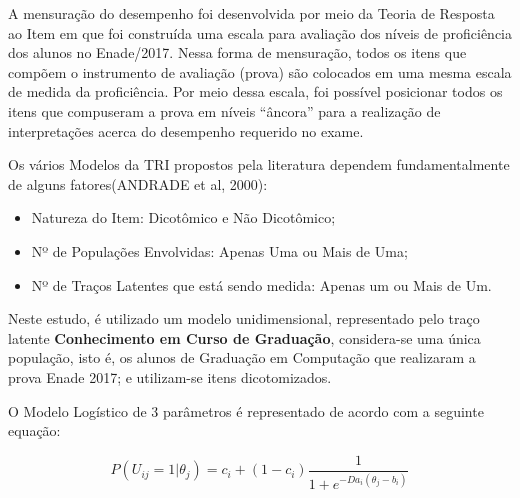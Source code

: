 \documentclass[12pt]{article}
\begin{document}
A mensuração do desempenho foi desenvolvida por meio da Teoria de Resposta ao Item em que foi construída uma escala para avaliação dos níveis de proficiência dos alunos no Enade/2017. Nessa forma de mensuração, todos os itens que compõem o instrumento de avaliação (prova) são colocados em uma mesma escala de medida da proficiência. Por meio dessa escala, foi possível posicionar todos os itens que compuseram a prova em níveis “âncora” para a realização de interpretações acerca do desempenho requerido no exame.

Os vários Modelos da TRI propostos pela literatura dependem fundamentalmente de alguns fatores(ANDRADE et al, 2000):\vskip0.3cm

\begin{itemize}
\item Natureza do Item: Dicotômico e Não Dicotômico;
\item Nº de Populações Envolvidas: Apenas Uma ou Mais de Uma;
\item Nº de Traços Latentes que está sendo medida: Apenas um ou Mais de Um.
\end{itemize}


Neste estudo, é utilizado um modelo unidimensional, representado pelo traço latente \textbf{Conhecimento em Curso de Graduação}, considera-se uma única população, isto é, os alunos de Graduação em Computação que realizaram a prova Enade 2017; e utilizam-se itens dicotomizados.\vskip0.3cm


\newpage

O Modelo Logístico de 3 parâmetros é representado de acordo com a seguinte equação:

\begin{equation}
    P(U_{ij}=1|\theta_{j})= c_{i}+(1-c_{i})\frac{1}{1+e^{-Da_{i}(\theta_{j}-b_{i})}}
\end{equation}
\vskip0.3cm
\end{document}
